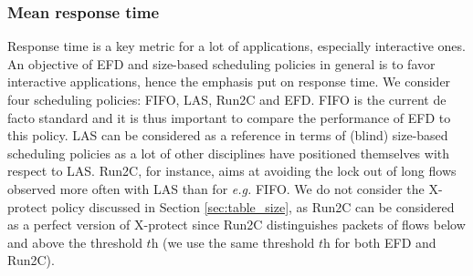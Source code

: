 \documentclass[preprint,12pt]{elsarticle}
\begin{document}
\begin{table}[ht]
		\centering
    \caption{Statistics - flow table size}
		\vspace{5mm}
    \label{tab:flow_table_size}  
\end{table}

\subsubsection{Mean response time}

Response time is a key metric for a lot of applications, especially interactive ones. An objective of EFD and size-based scheduling policies in general  is to favor interactive applications, hence the emphasis put on response time. We consider four scheduling policies: FIFO, LAS, Run2C and EFD. FIFO is the current de facto standard and it is thus important to compare the performance of EFD to this policy. LAS can be considered as a reference in terms of (blind) size-based scheduling policies as a lot of other disciplines have positioned themselves with respect to LAS. Run2C, for instance, aims at avoiding the lock out of long flows observed more often with LAS than for \textit{e.g.}  FIFO. We do not consider the X-protect policy discussed in Section \ref{sec:table_size}, as Run2C can be considered as a perfect version of X-protect since Run2C distinguishes packets of flows below and above the threshold $\textit{th}$ (we use the same threshold $\textit{th}$ for both EFD and Run2C).

\end{document}
